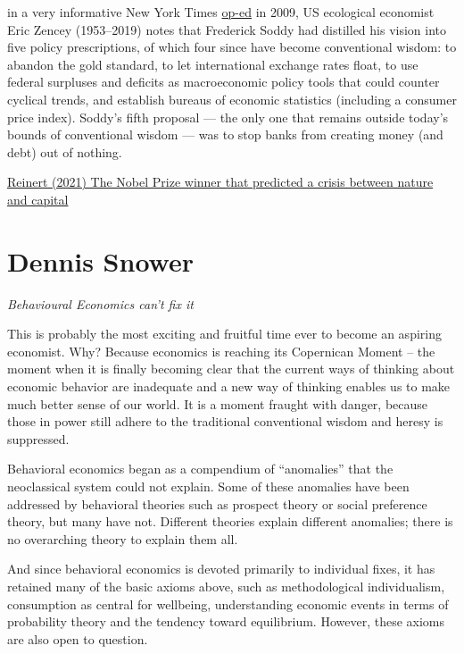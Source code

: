 \documentclass[
]{book}
\begin{document}
in a very informative New York Times \href{https://www.nytimes.com/2009/04/12/opinion/12zencey.html}{op-ed} in 2009, US ecological economist Eric Zencey (1953--2019) notes that Frederick Soddy had distilled his vision into five policy prescriptions, of which four since have become conventional wisdom: to abandon the gold standard, to let international exchange rates float, to use federal surpluses and deficits as macroeconomic policy tools that could counter cyclical trends, and establish bureaus of economic statistics (including a consumer price index). Soddy's fifth proposal --- the only one that remains outside today's bounds of conventional wisdom --- was to stop banks from creating money (and debt) out of nothing.

\href{https://developingeconomics.org/2021/12/27/the-nobel-prize-winner-that-predicted-a-crisis-between-nature-and-capital/}{Reinert (2021) The Nobel Prize winner that predicted a crisis between nature and capital}

\hypertarget{dennis-snower}{%
\section{Dennis Snower}\label{dennis-snower}}

\emph{Behavioural Economics can't fix it}

This is probably the most exciting and fruitful time ever to become an aspiring economist. Why? Because economics is reaching its Copernican Moment -- the moment when it is finally becoming clear that the current ways of thinking about economic behavior are inadequate and a new way of thinking enables us to make much better sense of our world. It is a moment fraught with danger, because those in power still adhere to the traditional conventional wisdom and heresy is suppressed.

Behavioral economics began as a compendium of ``anomalies'' that the neoclassical system could not explain. Some of these anomalies have been addressed by behavioral theories such as prospect theory or social preference theory, but many have not. Different theories explain different anomalies; there is no overarching theory to explain them all.

And since behavioral economics is devoted primarily to individual fixes, it has retained many of the basic axioms above, such as methodological individualism, consumption as central for wellbeing, understanding economic events in terms of probability theory and the tendency toward equilibrium. However, these axioms are also open to question.
\end{document}
